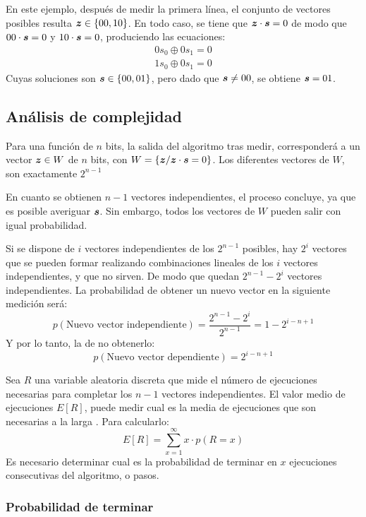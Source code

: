 En este ejemplo, después de medir la primera línea, el conjunto de vectores 
posibles resulta $\boldsymbol{z} \in \{00, 10\}$. En todo caso, se tiene que $ \boldsymbol{z} \cdot \boldsymbol{s} = 
0$ de modo que $00 \cdot \boldsymbol{s} = 0$ y $10 \cdot \boldsymbol{s} = 0$, produciendo las 
ecuaciones:
%
\begin{equation}
\begin{split}
	0 s_0 \oplus 0 s_1 = 0 \\
	1 s_0 \oplus 0 s_1 = 0
\end{split}
\end{equation}
%
Cuyas soluciones son $\boldsymbol{s} \in \{00, 01\}$, pero dado que $\boldsymbol{s} \neq 00$, se obtiene 
$\boldsymbol{s} = 01$.

\subsection{Análisis de complejidad}

Para una función de $n$ bits, la salida del algoritmo tras medir, corresponderá 
a un vector $\boldsymbol{z} \in W$ de $n$ bits, con $W = \{\boldsymbol{z} / \boldsymbol{z} \cdot \boldsymbol{s} = 0\}$.  
Los diferentes vectores de $W$, son exactamente $2^{n-1}$

En cuanto se obtienen $n-1$ vectores independientes, el proceso concluye, ya que 
es posible averiguar $\boldsymbol{s}$. Sin embargo, todos los vectores de $W$ pueden salir 
con igual probabilidad.

Si se dispone de $i$ vectores independientes de los $2^{n-1}$ posibles, hay 
$2^i$ vectores que se pueden formar realizando combinaciones lineales de los $i$ 
vectores independientes, y que no sirven. De modo que quedan $2^{n-1} - 2^i$ 
vectores independientes. La probabilidad de obtener un nuevo vector en la 
siguiente medición será:
$$ p(\text{Nuevo vector independiente}) = \frac{2^{n-1} - 2^i}{2^{n-1}} = 1 - 
2^{i-n+1} $$
Y por lo tanto, la de no obtenerlo:
$$ p(\text{Nuevo vector dependiente}) = 2^{i-n+1} $$

Sea $R$ una variable aleatoria discreta que mide el número de ejecuciones 
necesarias para completar los $n-1$ vectores independientes. El valor medio de 
ejecuciones $E[R]$, puede medir cual es la media de ejecuciones que son 
necesarias a la larga \cite{ross99}. Para calcularlo:
%
$$ E[R] = \sum^{\infty}_{x=1} x \cdot p(R=x) $$
%
Es necesario determinar cual es la probabilidad de terminar en $x$ ejecuciones 
consecutivas del algoritmo, o pasos.

\subsubsection{Probabilidad de terminar}

